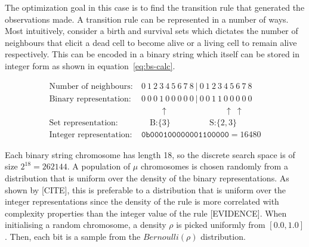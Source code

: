 The optimization goal in this case is to find the transition rule that generated the observations made. A transition rule can be represented in a number of ways. Most intuitively, consider a birth and survival sets which dictates the number of neighbours that elicit a dead cell to become alive or a living cell to remain alive respectively. This can be encoded in a binary string which itself can be stored in integer form as shown in equation~\ref{eq:bs-calc}.

\begin{equation} \label{eq:bs-calc}
\begin{split}
    \text{Number of neighbours:}&\ 0\ 1\ 2\ 3\ 4\ 5\ 6\ 7\ 8\ |\ 0\ 1\ 2\ 3\ 4\ 5\ 6\ 7\ 8\\
    \text{Binary representation:}&\ 0\ 0\ 0\ 1\ 0\ 0\ 0\ 0\ 0\ |\ 0\ 0\ 1\ 1\ 0\ 0\ 0\ 0\ 0\\
    &\qquad\ \: \uparrow \qquad \qquad \qquad \ \: \: \uparrow \ \uparrow\\
    \text{Set representation:}&\quad \ \text{B:} \{3\} \qquad \qquad \ \ \: \text{S:}\{2, 3\}\\
    \text{Integer representation:}&\ \texttt{0b000100000001100000} = 16480
\end{split}   
\end{equation}

Each binary string chromosome has length 18, so the discrete search space is of size $2^{18} = 262144$. A population of $\mu$ chromosomes is chosen randomly from a distribution that is uniform over the density of the binary representations. As shown by [CITE], this is preferable to a distribution that is uniform over the integer representations since the density of the rule is more correlated with complexity properties than the integer value of the rule [EVIDENCE]. When initialising a random chromosome, a density $\rho$ is picked uniformly from $[0.0, 1.0]$. Then, each bit is a sample from the $\mathit{Bernoulli}(\rho)$ distribution.\\


